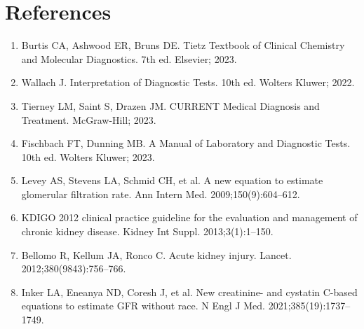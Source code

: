 \section*{References}
\begin{enumerate}
  \item Burtis CA, Ashwood ER, Bruns DE. Tietz Textbook of Clinical Chemistry and Molecular Diagnostics. 7th ed. Elsevier; 2023.
  \item Wallach J. Interpretation of Diagnostic Tests. 10th ed. Wolters Kluwer; 2022.
  \item Tierney LM, Saint S, Drazen JM. CURRENT Medical Diagnosis and Treatment. McGraw-Hill; 2023.
  \item Fischbach FT, Dunning MB. A Manual of Laboratory and Diagnostic Tests. 10th ed. Wolters Kluwer; 2023.
  \item Levey AS, Stevens LA, Schmid CH, et al. A new equation to estimate glomerular filtration rate. Ann Intern Med. 2009;150(9):604--612.
  \item KDIGO 2012 clinical practice guideline for the evaluation and management of chronic kidney disease. Kidney Int Suppl. 2013;3(1):1--150.
  \item Bellomo R, Kellum JA, Ronco C. Acute kidney injury. Lancet. 2012;380(9843):756--766.
  \item Inker LA, Eneanya ND, Coresh J, et al. New creatinine- and cystatin C-based equations to estimate GFR without race. N Engl J Med. 2021;385(19):1737--1749.
\end{enumerate}

\clearpage
